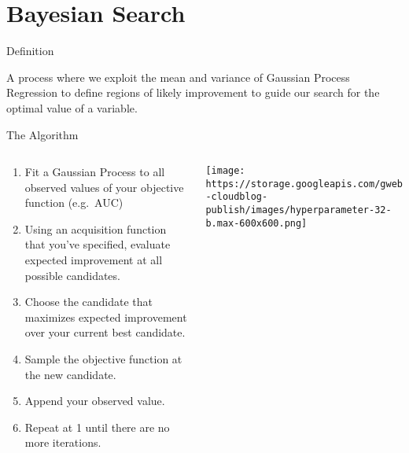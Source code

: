 \documentclass[10pt,ignorenonframetext,]{beamer}
\providecommand{\tightlist}{%
  \setlength{\itemsep}{0pt}\setlength{\parskip}{0pt}}
\begin{document}
\hypertarget{bayesian-search}{%
\section{Bayesian Search}\label{bayesian-search}}

\begin{frame}{Definition}
\protect\hypertarget{definition-2}{}

A process where we exploit the mean and variance of Gaussian Process
Regression to define regions of likely improvement to guide our search
for the optimal value of a variable.

\end{frame}

\begin{frame}{The Algorithm}
\protect\hypertarget{the-algorithm}{}

\begin{columns}[T]
\begin{column}{0.48\textwidth}
\footnotesize

\begin{enumerate}
\tightlist
\item
  Fit a Gaussian Process to all observed values of your objective
  function (e.g.~AUC)
\item
  Using an acquisition function that you've specified, evaluate expected
  improvement at all possible candidates.
\item
  Choose the candidate that maximizes expected improvement over your
  current best candidate.
\item
  Sample the objective function at the new candidate.
\item
  Append your observed value.
\item
  Repeat at 1 until there are no more iterations.\\
\end{enumerate}
\end{column}

\begin{column}{0.48\textwidth}
\texttt{[image: https://storage.googleapis.com/gweb-cloudblog-publish/images/hyperparameter-32-b.max-600x600.png]}
\end{column}
\end{columns}

\end{frame}
\end{document}
